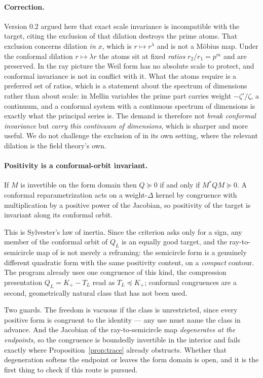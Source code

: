 \paragraph{Correction.} Version 0.2 argued here that exact scale invariance is
incompatible with the target, citing the exclusion of \cite{ExclusionMap} that
dilation destroys the prime atoms. That exclusion concerns dilation \emph{in
$x$}, which is $r\mapsto r^\lambda$ and is not a Möbius map. Under the conformal
dilation $r\mapsto\lambda r$ the atoms sit at fixed \emph{ratios}
$r_2/r_1=p^m$ and are preserved. In the ray picture the Weil form has no absolute
scale to protect, and conformal invariance is not in conflict with it. What the
atoms require is a preferred set of ratios, which is a statement about the
spectrum of dimensions rather than about scale: in Mellin variables the prime
part carries weight $-\zeta'/\zeta$, a continuum, and a conformal system with a
continuous spectrum of dimensions is exactly what the principal series is. The
demand is therefore not \emph{break conformal invariance} but \emph{carry this
continuum of dimensions}, which is sharper and more useful. We do not challenge
the exclusion of \cite{ExclusionMap} in its own setting, where the relevant
dilation is the field theory's own.

\paragraph{Positivity is a conformal-orbit invariant.}
\begin{proposition}[Congruence]\label{prop:congruence}
If $M$ is invertible on the form domain then $Q\succeq0$ if and only if
$M^*QM\succeq0$. A conformal reparametrization acts on a weight-$\Delta$ kernel
by congruence with multiplication by a positive power of the Jacobian, so
positivity of the target is invariant along its conformal orbit.
\end{proposition}
This is Sylvester's law of inertia. Since the criterion asks only for a sign, any
member of the conformal orbit of $Q_L$ is an equally good target, and the
ray-to-semicircle map of \cite{OWL} is not merely a reframing: the semicircle
form is a genuinely different quadratic form with the same positivity content, on
a \emph{compact} contour. The program already uses one congruence of this kind,
the compression presentation $Q_L=K_+-T_L$ read as $T_L\preceq K_+$; conformal
congruences are a second, geometrically natural class that has not been used.

Two guards. The freedom is vacuous if the class is unrestricted, since every
positive form is congruent to the identity --- any use must name the class in
advance. And the Jacobian of the ray-to-semicircle map \emph{degenerates at the
endpoints}, so the congruence is boundedly invertible in the interior and fails
exactly where Proposition~\ref{prop:trace} already obstructs. Whether that
degeneration softens the endpoint or leaves the form domain is open, and it is the
first thing to check if this route is pursued.

